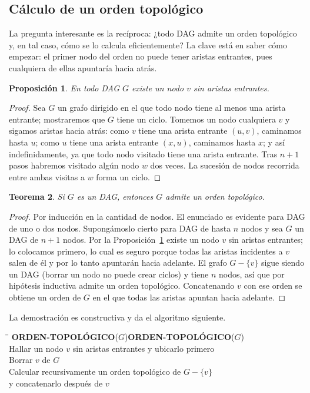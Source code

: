\documentclass[12pt, spanish, oneside, openany]{book}
\newcommand{\pl}[1]{\makebox[1.6em][r]{\texttt{\footnotesize #1}}\hspace{0.9em}}
\newenvironment{pseudo}[1]{%
  \begin{center}%
  \begin{mdframed}[style=pseudobox]%
  \small
  \begin{tabbing}%
  \hspace{2.5em}\=\hspace{1.5em}\=\hspace{1.5em}\=\hspace{1.5em}\=\hspace{1.5em}\=\kill
  \def\pseudotitulo{#1}\ifx\pseudotitulo\empty\else#1\\[3pt]\fi}%
  {\end{tabbing}\end{mdframed}\end{center}}
\theoremstyle{uprightplain}
\newtheorem{teorema}{Teorema}[section]
\newtheorem{proposicion}[teorema]{Proposición}
\theoremstyle{definition}
\theoremstyle{remark}
\theoremstyle{definition}
\begin{document}
\subsection{Cálculo de un orden topológico}

La pregunta interesante es la recíproca: ¿todo DAG admite un orden topológico y, en tal caso, cómo se lo calcula eficientemente? La clave está en saber cómo empezar: el primer nodo del orden no puede tener aristas entrantes, pues cualquiera de ellas apuntaría hacia atrás.

\begin{proposicion}
\label{prop:nodo-sin-entrantes}
En todo DAG $G$ existe un nodo $v$ sin aristas entrantes.
\end{proposicion}
\begin{proof}
Sea $G$ un grafo dirigido en el que todo nodo tiene al menos una arista entrante; mostraremos que $G$ tiene un ciclo. Tomemos un nodo cualquiera $v$ y sigamos aristas hacia atrás: como $v$ tiene una arista entrante $(u,v)$, caminamos hasta $u$; como $u$ tiene una arista entrante $(x,u)$, caminamos hasta $x$; y así indefinidamente, ya que todo nodo visitado tiene una arista entrante. Tras $n+1$ pasos habremos visitado algún nodo $w$ dos veces. La sucesión de nodos recorrida entre ambas visitas a $w$ forma un ciclo.
\end{proof}

\begin{teorema}
\label{teo:dag-topologico}
Si $G$ es un DAG, entonces $G$ admite un orden topológico.
\end{teorema}
\begin{proof}
Por inducción en la cantidad de nodos. El enunciado es evidente para DAG de uno o dos nodos. Supongámoslo cierto para DAG de hasta $n$ nodos y sea $G$ un DAG de $n+1$ nodos. Por la Proposición~\ref{prop:nodo-sin-entrantes} existe un nodo $v$ sin aristas entrantes; lo colocamos primero, lo cual es seguro porque todas las aristas incidentes a $v$ salen de él y por lo tanto apuntarán hacia adelante. El grafo $G-\{v\}$ sigue siendo un DAG (borrar un nodo no puede crear ciclos) y tiene $n$ nodos, así que por hipótesis inductiva admite un orden topológico. Concatenando $v$ con ese orden se obtiene un orden de $G$ en el que todas las aristas apuntan hacia adelante.
\end{proof}

La demostración es constructiva y da el algoritmo siguiente.

\begin{pseudo}{\textbf{ORDEN-TOPOLÓGICO}($G$)}
\pl{1}\> Hallar un nodo $v$ sin aristas entrantes y ubicarlo primero\\
\pl{2}\> Borrar $v$ de $G$\\
\pl{3}\> Calcular recursivamente un orden topológico de $G-\{v\}$\\
\pl{4}\> y concatenarlo después de $v$
\end{pseudo}
\end{document}
